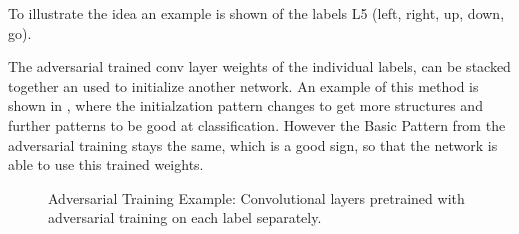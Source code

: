 To illustrate the idea an example is shown of the labels L5 (left, right, up, down, go).

The adversarial trained conv layer weights of the individual labels, can be stacked together an used to initialize another network.
An example of this method is shown in , where the initialzation pattern changes to get more structures and further patterns to be good at classification. However the Basic Pattern from the adversarial training stays the same, which is a good sign, so that the network is able to use this trained weights.

\begin{figure}[!ht]
  \centering
    \quad
  \caption{Adversarial Training Example: Convolutional layers pretrained with adversarial training on each label separately.}
  \label{fig:ml_adv_example}
\end{figure}
\FloatBarrier
\noindent

